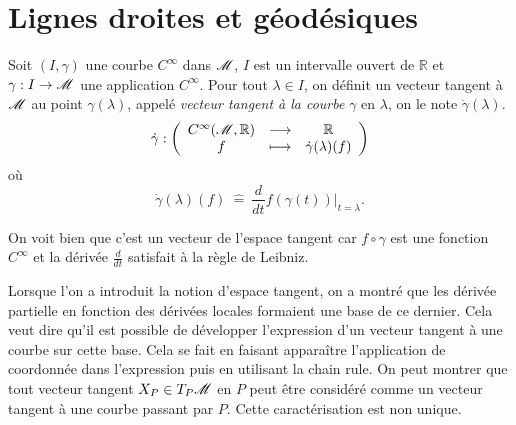 \documentclass[a4paper,11pt]{report}
\begin{document}
        \section{Lignes droites et géodésiques}
        
            \begin{definition}
                Soit $(I,\gamma)$ une courbe $C^\infty$ dans $\mathscr{M}$, $I$ est  un intervalle ouvert de $\mathbb{R}$ et $\gamma:I\to\mathscr{M}$ une application $C^\infty$. Pour tout $\lambda\in I$, on définit un vecteur tangent à $\mathscr{M}$ au point $\gamma(\lambda)$, appelé \textit{vecteur tangent à la courbe} $\gamma$ en $\lambda$, on le note $\dot{\gamma}(\lambda)$.
                \begin{equation}
                    \dot{\gamma}:\left(
                    \begin{array}{ccc}
                        C^\infty(\mathscr{M},\mathbb{R}) & \longrightarrow & \mathbb{R} \\
                        f & \longmapsto & \dot{\gamma}(\lambda)(f)
                    \end{array}
                    \right)
                    \end{equation}
                    où
                    \begin{equation}
                         \dot{\gamma}(\lambda)(f) ~\hat{=}~ \frac{d}{dt}f(\gamma(t))|_{t=\lambda}.
                    \end{equation}
            \end{definition}
            
            On voit bien que c'est un vecteur de l'espace tangent car $f\circ\gamma$ est une fonction $C^\infty$ et la dérivée $\frac{d}{dt}$ satisfait à la règle de Leibniz.
            
            \begin{rmk}
                Lorsque l'on a introduit la notion d'espace tangent, on a montré que les dérivée partielle en fonction des dérivées locales formaient une base de ce dernier. Cela veut dire qu'il est possible de développer l'expression d'un vecteur tangent à une courbe sur cette base. Cela se fait en faisant apparaître l'application de coordonnée dans l'expression puis en utilisant la chain rule. On peut montrer que tout vecteur tangent $X_P\in T_P\mathscr{M}$ en $P$ peut être considéré comme un vecteur tangent à une courbe passant par $P$. Cette caractérisation est non unique.
            \end{rmk}
            
\end{document}

